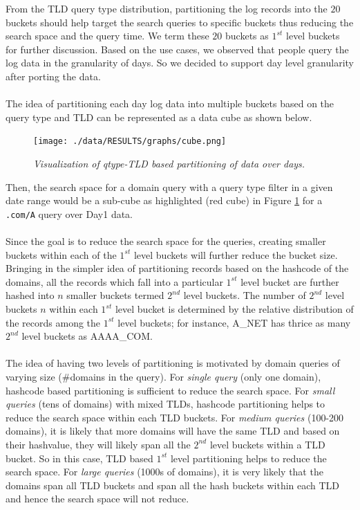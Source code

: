 \documentclass[11pt,a4paper]{article}
\begin{document}
\noindent
From the TLD query type distribution, partitioning the log records into the $20$ buckets should help target the search queries to specific buckets thus reducing the search space and the query time. We term these $20$ buckets as $1^{st}$ level buckets for further discussion. Based on the use cases, we observed that people query the log data in the granularity of days. So we decided to support day level granularity after porting the data.
\\\\
The idea of partitioning each day log data into multiple buckets based on the query type and TLD can be represented as a data cube as shown below.
\begin{figure}[H] 
\centering
\texttt{[image: ./data/RESULTS/graphs/cube.png]}
\caption {\textit{Visualization of qtype-TLD based partitioning of data over days.}}
\label{cube}
\end{figure}

\noindent
Then, the search space for a domain query with a query type filter in a given date range would be a sub-cube as highlighted (red cube) in Figure \ref{cube} for a \texttt{.com/A} query over Day1 data.
\\\\
Since the goal is to reduce the search space for the queries, creating smaller buckets within each of the $1^{st}$ level buckets will further reduce the bucket size. Bringing in the simpler idea of partitioning records based on the hashcode of the domains, all the records which fall into a particular $1^{st}$ level bucket are further hashed into $n$ smaller buckets termed $2^{nd}$ level buckets. The number of $2^{nd}$ level buckets $n$ within each $1^{st}$ level bucket is determined by the relative distribution of the records among the $1^{st}$ level buckets; for instance, A\_NET has thrice as many $2^{nd}$ level buckets as AAAA\_COM.
\\\\
The idea of having two levels of partitioning is motivated by domain queries of varying size (\#domains in the query). For \textit{single query} (only one domain), hashcode based partitioning is sufficient to reduce the search space. For \textit{small queries} (tens of domains) with mixed TLDs, hashcode partitioning helps to reduce the search space within each TLD buckets. For \textit{medium queries} (100-200 domains), it is likely that more domains will have the same TLD and based on their hashvalue, they will likely span all the $2^{nd}$ level buckets within a TLD bucket. So in this case, TLD based $1^{st}$ level partitioning helps to reduce the search space. For \textit{large queries} (1000s of domains), it is very likely that the domains span all TLD buckets and span all the hash buckets within each TLD and hence the search space will not reduce.
\end{document}
